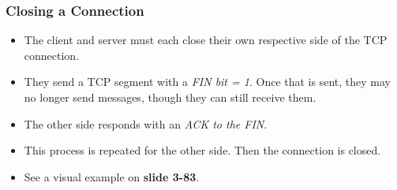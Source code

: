 \documentclass{article}
\begin{document}
\subsubsection{Closing a Connection}
\begin{itemize}
\item The client and server must each close their own respective side of the TCP connection.
\item They send a TCP segment with a \emph{FIN bit = 1}. Once that is sent, they may no longer send messages, though they can still receive them.
\item The other side responds with an \emph{ACK to the FIN}.
\item This process is repeated for the other side. Then the connection is closed.
\item See a visual example on {\bf slide 3-83}.
\end{itemize}
\end{document}
